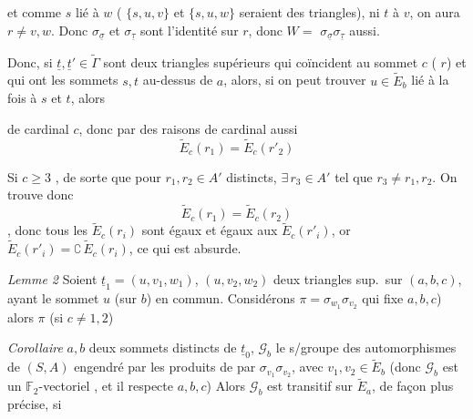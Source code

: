 \documentclass[11pt,a4paper]{article}
\begin{document}
et comme $s$  lié à $w$ ( $\{s,u,v\}$ et $\{s,u,w\}$ seraient
des triangles), ni $t$ à $v$, on aura
$r\neq v,w$. Donc $\sigma_{\underline{\sigma}}$ et $\sigma_{\underline{\tau}}$
sont l'identité sur $r$, donc  $W=$
$\sigma_{\underline{\sigma}}\sigma_{\underline{\tau}}$ aussi.

Donc, si \struck{\ill{}} $\underline{t},\underline{t}'\in\widetilde{\Gamma}$ sont
deux triangles supérieurs qui coïncident  au sommet $c$
( $r$) et qui ont  les sommets $s,t$ au-dessus de
$a$, alors, si on peut trouver $u\in\widetilde{E}_b$ lié à la fois à
$s$ et $t$, alors


de cardinal $c$, donc par des raisons de cardinal \ill{} aussi
\[
  \widetilde{E}_c(r_1)=\widetilde{E}_c(r'_2)
\]

Si  $c\geqslant3$ , de sorte que pour
$r_1,r_2\in A'$ distincts, $\exists\,r_3\in A'$ tel que $r_3\neq r_1,r_2$. On trouve
donc
\[
  \widetilde{E}_c(r_1)=\widetilde{E}_c(r_2)
\]
,
donc tous les $\widetilde{E}_c(r_i)$ 
sont égaux et égaux aux $\widetilde{E}_c(r'_i)$, or
$\widetilde{E}_c(r'_i)=\complement\,\widetilde{E}_c(r_i)$, ce qui est absurde.

\emph{Lemme 2} Soient 
$\underline{t}_1=(u,v_1,w_1)$,  $(u,v_2,w_2)$ deux
triangles sup.\ sur $(a,b,c)$, ayant le sommet $u$ (sur $b$) en commun.
Considérons $\pi=\sigma_{w_1}\sigma_{v_2}$ \ill{}  \ill{}
qui fixe $a,b,c$) alors $\pi$ 
 (si $c\neq1,2$)

\emph{Corollaire}  $a,b$ deux sommets distincts de
$\underline{t}_0$, $\mathcal{G}_b$ le s/groupe  des
automorphismes de $(S,A)$ engendré par les produits de 
 par $\sigma_{v_1}\sigma_{v_2}$, avec
$v_1,v_2\in\widetilde{E}_b$ \ill{} (donc $\mathcal{G}_b$ est un
\struck{\ill{}} $\mathbb{F}_2$-vectoriel \ill{}, et il respecte $a,b,c$) Alors
$\mathcal{G}_b$ est transitif sur $\widetilde{E}_a$, de façon plus précise, si
\end{document}
